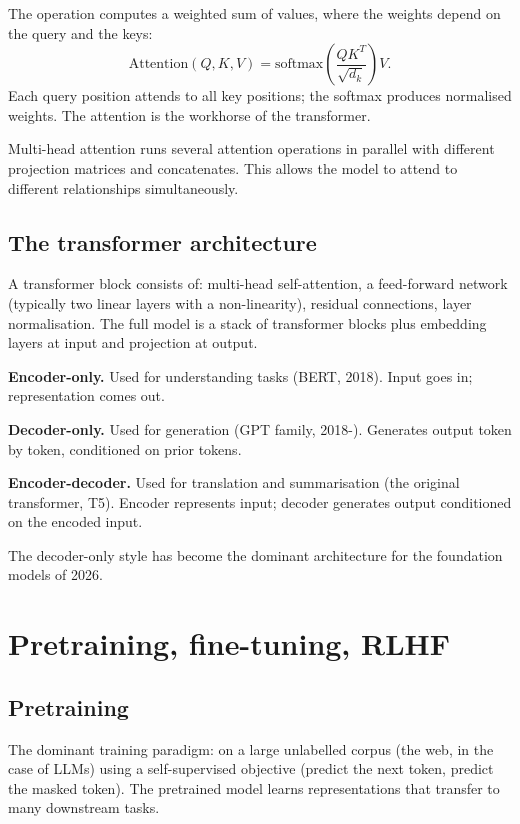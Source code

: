The  operation computes a weighted sum of values, where the weights depend on the query and the keys:
\[
\text{Attention}(Q, K, V) = \text{softmax}\left(\frac{Q K^T}{\sqrt{d_k}}\right) V.
\]
Each query position attends to all key positions; the softmax produces normalised weights. The attention is the workhorse of the transformer.

Multi-head attention runs several attention operations in parallel with different projection matrices and concatenates. This allows the model to attend to different relationships simultaneously.

\subsection{The transformer architecture}

A transformer block consists of: multi-head self-attention, a feed-forward network (typically two linear layers with a non-linearity), residual connections, layer normalisation. The full model is a stack of transformer blocks plus embedding layers at input and projection at output.

\textbf{Encoder-only.} Used for understanding tasks (BERT, 2018). Input goes in; representation comes out.

\textbf{Decoder-only.} Used for generation (GPT family, 2018-). Generates output token by token, conditioned on prior tokens.

\textbf{Encoder-decoder.} Used for translation and summarisation (the original transformer, T5). Encoder represents input; decoder generates output conditioned on the encoded input.

The decoder-only style has become the dominant architecture for the foundation models of 2026.

\section{Pretraining, fine-tuning, RLHF}

\subsection{Pretraining}

The dominant training paradigm:  on a large unlabelled corpus (the web, in the case of LLMs) using a self-supervised objective (predict the next token, predict the masked token). The pretrained model learns representations that transfer to many downstream tasks.

